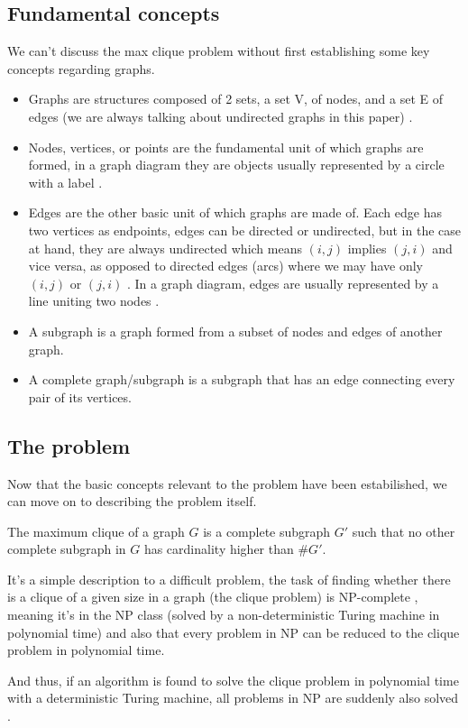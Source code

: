\documentclass[...]{revdetua}
\begin{document}
\subsection{Fundamental concepts}
We can’t discuss the max clique problem without first establishing some key concepts regarding graphs.
\begin{itemize}
\item Graphs are structures composed of 2 sets, a set V, of nodes, and a set E of edges (we are always talking about undirected graphs in this paper) \cite{graph}.
\item Nodes, vertices, or points are the fundamental unit of which graphs are formed, in a graph diagram they are objects usually represented by a circle with a label  \cite{graph}.
\item Edges are the other basic unit of which graphs are made of. Each edge has two vertices as endpoints, edges can be directed or undirected, but in the case at hand, they are always undirected which means $(i,j)$ implies $(j,i)$ and vice versa, as opposed to directed edges (arcs) where we may have only $(i,j)$ or $(j,i)$ . In a graph diagram, edges are usually represented by a line uniting two nodes  \cite{graph}.
\item A subgraph is a graph formed from a subset of nodes and edges of another graph\cite{subgraph}.
\item A complete graph/subgraph is a subgraph that has an edge connecting every pair of its  vertices\cite{completegraph}.
\end{itemize}
\subsection{The problem}
Now that the basic concepts relevant to the problem have been estabilished, we can move on to describing the problem itself.\par
The maximum clique of a graph $G$ is a complete subgraph $G'$ such that no other complete subgraph in $G$ has cardinality higher than $\#G'$.\par
It's a simple description to a difficult problem, the task of finding whether there is a clique of a given size in a graph (the clique problem) is NP-complete \cite{wikiclique}, meaning it's in the NP class (solved by a non-deterministic Turing machine in polynomial time) and also that every problem in NP can be reduced to the clique problem in polynomial time.\par 
And thus, if an algorithm is found to solve the clique problem in polynomial time with a deterministic Turing machine, all problems in NP are suddenly also solved \cite{wikinp}. 
\end{document}
